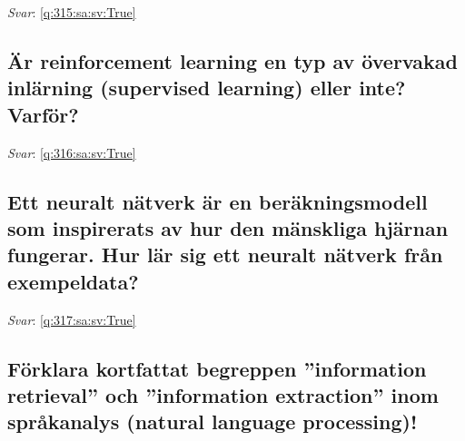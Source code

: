 \documentclass[a4paper,11pt,oneside]{article}
\begin{document}
\begin{sloppypar}
\label{q:315:sa:sv:False}

\vspace{2cm}

\noindent\makebox[\textwidth]{\hrulefill}

\vspace{1cm}

\textit{Svar}: \autoref{q:315:sa:sv:True}



\subsection{\"Ar reinforcement learning en typ av \"overvakad inl\"arning (supervised learning) eller inte? Varf\"or?}

\label{q:316:sa:sv:False}

\vspace{2cm}

\noindent\makebox[\textwidth]{\hrulefill}

\vspace{1cm}

\textit{Svar}: \autoref{q:316:sa:sv:True}



\subsection{Ett neuralt n\"atverk \"ar en ber\"akningsmodell som inspirerats av hur den m\"anskliga hj\"arnan fungerar. Hur l\"ar sig ett neuralt n\"atverk fr\r{a}n exempeldata?}

\label{q:317:sa:sv:False}

\vspace{2cm}

\noindent\makebox[\textwidth]{\hrulefill}

\vspace{1cm}

\textit{Svar}: \autoref{q:317:sa:sv:True}



\subsection{F\"orklara kortfattat begreppen {\textquotedblright}information retrieval{\textquotedblright} och {\textquotedblright}information extraction{\textquotedblright} inom spr\r{a}kanalys (natural language processing)!}

\label{q:318:sa:sv:False}

\vspace{2cm}


\end{sloppypar}
\end{document}
